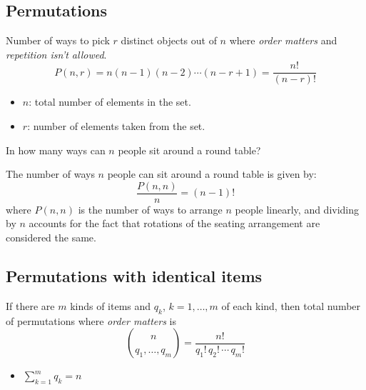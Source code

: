 \subsection{Permutations}
    \begin{definition}
        Number of ways to pick $r$ distinct objects out of $n$ where \emph{order matters} and \emph{repetition isn't allowed}.
        \begin{equation}
            P(n,r) = n(n-1)(n-2)\cdots(n-r+1) = \frac{n!}{(n-r)!} 
        \end{equation}
        \begin{itemize}
            \item $n$: total number of elements in the set.
            \item $r$: number of elements taken from the set.
        \end{itemize}
    \end{definition}

    \begin{example}
        In how many ways can \( n \) people sit around a round table?
        \vspace{1em}

        The number of ways \( n \) people can sit around a round table is given by:
        \[
        \frac{P(n,n)}{n} = (n-1)!
        \]
        where \( P(n,n) \) is the number of ways to arrange \( n \) people linearly, and dividing by \( n \) accounts for the fact that rotations of the seating arrangement are considered the same.
    \end{example}

\subsection{Permutations with identical items}
    \begin{definition}
        If there are $m$ kinds of items and $q_k$, $k=1,\ldots,m$ of each kind, then total number of permutations where \emph{order matters} is 
        \begin{equation}
            \binom{n}{q_1, \ldots, q_m} = \frac{n!}{q_1! \, q_2! \, \cdots \, q_m!}
        \end{equation}
        \begin{itemize}
            \item $\sum_{k=1}^{m} q_k = n$
        \end{itemize}
    \end{definition}

